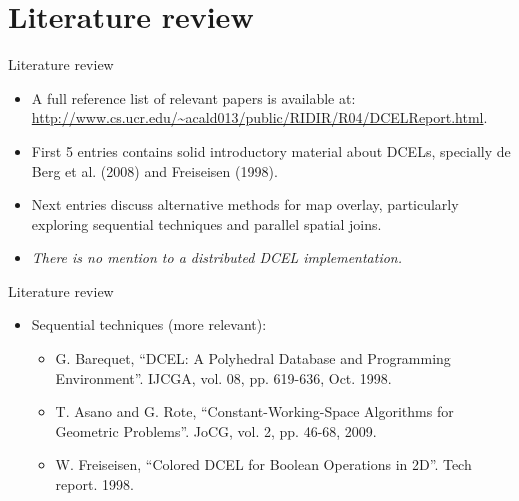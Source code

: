 \documentclass{beamer}
\begin{document}
\section{Literature review}

\begin{frame}{Literature review}
    \begin{itemize}
        \item A full reference list of relevant papers is available at: \url{http://www.cs.ucr.edu/~acald013/public/RIDIR/R04/DCELReport.html}.
        \item First 5 entries contains solid introductory material about DCELs, specially de Berg et al. (2008) and Freiseisen (1998).
        \item Next entries discuss alternative methods for map overlay, particularly exploring sequential techniques and parallel spatial joins.
        \item \textit{There is no mention to a distributed DCEL implementation.}
    \end{itemize}
\end{frame}

\begin{frame}{Literature review}
    \begin{itemize}
        \item Sequential techniques (more relevant):
        \begin{itemize}
            \item G. Barequet, ``DCEL: A Polyhedral Database and Programming Environment''. IJCGA, vol. 08, pp. 619-636, Oct. 1998.
            \item T. Asano and G. Rote, ``Constant-Working-Space Algorithms for Geometric Problems''. JoCG, vol. 2, pp. 46-68, 2009.
            \item W. Freiseisen, ``Colored DCEL for Boolean Operations in 2D''. Tech report. 1998.
        \end{itemize}
    \end{itemize}
\end{frame}
\end{document}
